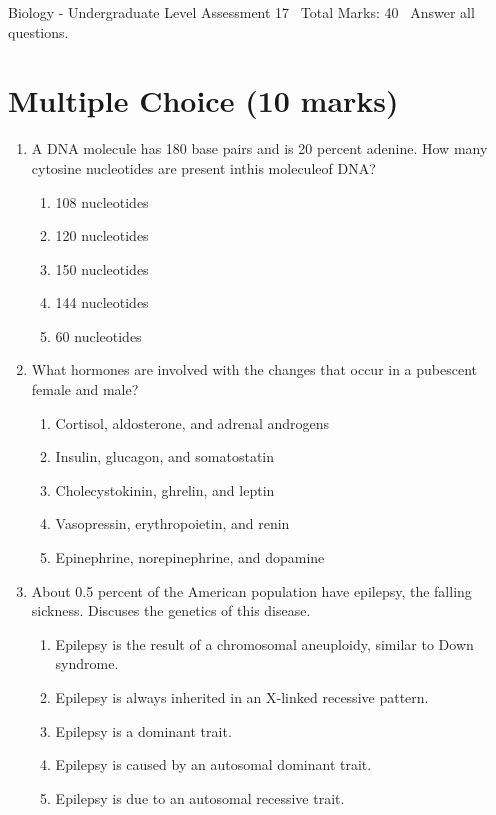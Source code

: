 \documentclass[12pt]{article}
\begin{document}
\begin{center}
Biology - Undergraduate Level Assessment 17 \
Total Marks: 40 \
Answer all questions.
\end{center}

\section*{Multiple Choice (10 marks)}
\begin{enumerate}[label=\arabic*.]
\item A DNA molecule has 180 base pairs and is 20 percent adenine. How many cytosine nucleotides are present inthis moleculeof DNA?
\begin{enumerate}[label=(\alph*)]
    \item 108 nucleotides
    \item 120 nucleotides
    \item 150 nucleotides
    \item 144 nucleotides
    \item 60 nucleotides
\end{enumerate}
\item What hormones are involved with the changes that occur in a pubescent female and male?
\begin{enumerate}[label=(\alph*)]
    \item Cortisol, aldosterone, and adrenal androgens
    \item Insulin, glucagon, and somatostatin
    \item Cholecystokinin, ghrelin, and leptin
    \item Vasopressin, erythropoietin, and renin
    \item Epinephrine, norepinephrine, and dopamine
\end{enumerate}
\item About 0.5 percent of the American population have epilepsy, the falling sickness. Discuses the genetics of this disease.
\begin{enumerate}[label=(\alph*)]
    \item Epilepsy is the result of a chromosomal aneuploidy, similar to Down syndrome.
    \item Epilepsy is always inherited in an X-linked recessive pattern.
    \item Epilepsy is a dominant trait.
    \item Epilepsy is caused by an autosomal dominant trait.
    \item Epilepsy is due to an autosomal recessive trait.

\end{enumerate}
\end{enumerate}
\end{document}
